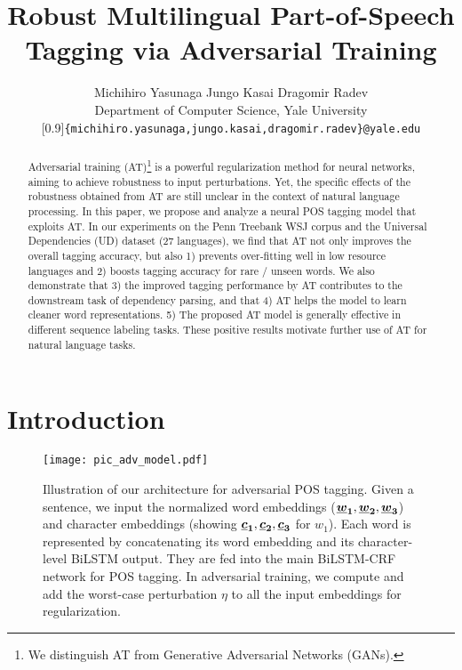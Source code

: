 \documentclass[11pt,a4paper]{article}
\title{Robust Multilingual 
Part-of-Speech Tagging 
via Adversarial Training}
\author{Michihiro Yasunaga \quad\quad\quad Jungo Kasai \quad\quad\quad Dragomir Radev\\
Department of Computer Science, Yale University\\
\scalebox{0.85}[0.9]{{\tt \{michihiro.yasunaga,jungo.kasai,dragomir.radev\}@yale.edu}}}
\date{}
\newcommand{\veci}[1]{\mbox{\boldmath $#1$}}
\begin{document}
\setlength{\abovedisplayskip}{4pt}
\setlength{\belowdisplayskip}{4pt}
\setlength{\extrarowheight}{4pt} 



\maketitle


\begin{abstract}
Adversarial training (AT)\footnote{We distinguish AT from  Generative Adversarial Networks (GANs).} 
is a powerful regularization method for neural networks, aiming to achieve robustness to input perturbations.
Yet, the specific effects of the robustness obtained from AT are still unclear
in the context of natural language processing.
In this paper, we propose and analyze a neural POS tagging model that exploits AT.
In our experiments on the Penn Treebank WSJ corpus
and the Universal Dependencies (UD) dataset (27 languages),
we find that AT
not only improves the overall tagging accuracy, but also
1) prevents over-fitting well in low resource languages and
2) boosts tagging accuracy for rare \!/\! unseen words.
We also demonstrate that 3) the improved tagging performance by AT contributes to the downstream task of dependency parsing, and that 4)
AT helps the model to learn cleaner
word representations.
5) The proposed AT model is generally effective in different sequence labeling tasks.
These positive results motivate further use of AT for natural language tasks.
\end{abstract}




\section{Introduction}
\begin{figure}[!h]
    \hspace{-3mm}
    \centering
    \texttt{[image: pic\_adv\_model.pdf]}
    \caption{Illustration of our architecture for adversarial POS tagging.
    Given a sentence, we input the normalized word embeddings ($\veci{\uline{w}_1}, \veci{\uline{w}_2}, \veci{\uline{w}_3}$) and character embeddings (showing $\veci{\uline{c}_1}, \veci{\uline{c}_2}, \veci{\uline{c}_3}$ for $w_1$). 
    Each word is represented by concatenating its word embedding and 
    its character-level BiLSTM output.
    They are fed into the main BiLSTM-CRF network for POS tagging.
    In adversarial training, we compute and add the worst-case perturbation $\eta$ to all the input embeddings for regularization.
    }
    \label{fig:adv_pic}
\vspace{-4mm}
\end{figure}
\end{document}

